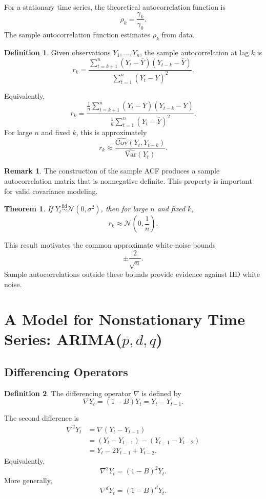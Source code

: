 \documentclass[12pt,oneside]{book}
\numberwithin{equation}{section}
\theoremstyle{definition}
\newtheorem{definition}{Definition}[section]
\newtheorem{remark}{Remark}[section]
\theoremstyle{plain}
\newtheorem{theorem}{Theorem}[section]
\theoremstyle{remark}
\newcommand{\Var}{\mathrm{Var}}
\newcommand{\Cov}{\mathrm{Cov}}
\newcommand{\iid}{\overset{\text{iid}}{\sim}}
\newcommand{\Normal}{\mathcal{N}}
\begin{document}
For a stationary time series, the theoretical autocorrelation function is
\[
\rho_k=\frac{\gamma_k}{\gamma_0}.
\]
The sample autocorrelation function estimates $\rho_k$ from data.

\begin{definition}
Given observations $Y_1,\ldots,Y_n$, the sample autocorrelation at lag $k$ is
\[
r_k
=
\frac{
\sum_{t=k+1}^n(Y_t-\overline{Y})(Y_{t-k}-\overline{Y})
}{
\sum_{t=1}^n(Y_t-\overline{Y})^2
}.
\]
\end{definition}

Equivalently,
\[
r_k
=
\frac{
\frac{1}{n}\sum_{t=k+1}^n(Y_t-\overline{Y})(Y_{t-k}-\overline{Y})
}{
\frac{1}{n}\sum_{t=1}^n(Y_t-\overline{Y})^2
}.
\]
For large $n$ and fixed $k$, this is approximately
\[
r_k
\approx
\frac{\widehat{\Cov}(Y_t,Y_{t-k})}{\widehat{\Var}(Y_t)}.
\]

\begin{remark}
The construction of the sample ACF produces a sample autocorrelation matrix that is nonnegative definite. This property is important for valid covariance modeling.
\end{remark}

\begin{theorem}
If $Y_t\iid \Normal(0,\sigma^2)$, then for large $n$ and fixed $k$,
\[
r_k\approx \Normal\left(0,\frac{1}{n}\right).
\]
\end{theorem}

This result motivates the common approximate white-noise bounds
\[
\pm \frac{2}{\sqrt{n}}.
\]
Sample autocorrelations outside these bounds provide evidence against IID white noise.

\section{A Model for Nonstationary Time Series: ARIMA($p,d,q$)}

\subsection{Differencing Operators}

\begin{definition}
The differencing operator $\nabla$ is defined by
\[
\nabla Y_t
=
(1-B)Y_t
=
Y_t-Y_{t-1}.
\]
\end{definition}

The second difference is
\begin{align*}
\nabla^2Y_t
&=
\nabla(Y_t-Y_{t-1}) \\
&=
(Y_t-Y_{t-1})-(Y_{t-1}-Y_{t-2}) \\
&=
Y_t-2Y_{t-1}+Y_{t-2}.
\end{align*}
Equivalently,
\[
\nabla^2Y_t=(1-B)^2Y_t.
\]
More generally,
\[
\nabla^dY_t=(1-B)^dY_t.
\]
\end{document}
